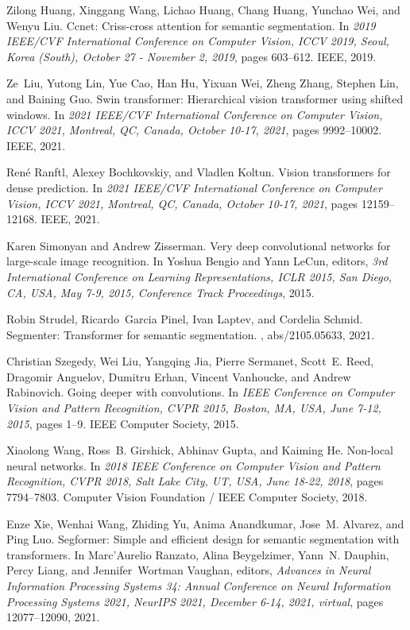 \documentclass[11pt]{article}
\begin{document}
\begin{thebibliography}{99}
Zilong Huang, Xinggang Wang, Lichao Huang, Chang Huang, Yunchao Wei, and Wenyu
  Liu.
\newblock Ccnet: Criss-cross attention for semantic segmentation.
\newblock In {\em 2019 {IEEE/CVF} International Conference on Computer Vision,
  {ICCV} 2019, Seoul, Korea (South), October 27 - November 2, 2019}, pages
  603--612. {IEEE}, 2019.

Ze~Liu, Yutong Lin, Yue Cao, Han Hu, Yixuan Wei, Zheng Zhang, Stephen Lin, and
  Baining Guo.
\newblock Swin transformer: Hierarchical vision transformer using shifted
  windows.
\newblock In {\em 2021 {IEEE/CVF} International Conference on Computer Vision,
  {ICCV} 2021, Montreal, QC, Canada, October 10-17, 2021}, pages 9992--10002.
  {IEEE}, 2021.

Ren{\'{e}} Ranftl, Alexey Bochkovskiy, and Vladlen Koltun.
\newblock Vision transformers for dense prediction.
\newblock In {\em 2021 {IEEE/CVF} International Conference on Computer Vision,
  {ICCV} 2021, Montreal, QC, Canada, October 10-17, 2021}, pages 12159--12168.
  {IEEE}, 2021.

Karen Simonyan and Andrew Zisserman.
\newblock Very deep convolutional networks for large-scale image recognition.
\newblock In Yoshua Bengio and Yann LeCun, editors, {\em 3rd International
  Conference on Learning Representations, {ICLR} 2015, San Diego, CA, USA, May
  7-9, 2015, Conference Track Proceedings}, 2015.

Robin Strudel, Ricardo~Garcia Pinel, Ivan Laptev, and Cordelia Schmid.
\newblock Segmenter: Transformer for semantic segmentation.
, abs/2105.05633, 2021.

Christian Szegedy, Wei Liu, Yangqing Jia, Pierre Sermanet, Scott~E. Reed,
  Dragomir Anguelov, Dumitru Erhan, Vincent Vanhoucke, and Andrew Rabinovich.
\newblock Going deeper with convolutions.
\newblock In {\em {IEEE} Conference on Computer Vision and Pattern Recognition,
  {CVPR} 2015, Boston, MA, USA, June 7-12, 2015}, pages 1--9. {IEEE} Computer
  Society, 2015.

Xiaolong Wang, Ross~B. Girshick, Abhinav Gupta, and Kaiming He.
\newblock Non-local neural networks.
\newblock In {\em 2018 {IEEE} Conference on Computer Vision and Pattern
  Recognition, {CVPR} 2018, Salt Lake City, UT, USA, June 18-22, 2018}, pages
  7794--7803. Computer Vision Foundation / {IEEE} Computer Society, 2018.

Enze Xie, Wenhai Wang, Zhiding Yu, Anima Anandkumar, Jose~M. Alvarez, and Ping
  Luo.
\newblock Segformer: Simple and efficient design for semantic segmentation with
  transformers.
\newblock In Marc'Aurelio Ranzato, Alina Beygelzimer, Yann~N. Dauphin, Percy
  Liang, and Jennifer~Wortman Vaughan, editors, {\em Advances in Neural
  Information Processing Systems 34: Annual Conference on Neural Information
  Processing Systems 2021, NeurIPS 2021, December 6-14, 2021, virtual}, pages
  12077--12090, 2021.


\end{thebibliography}
\end{document}
